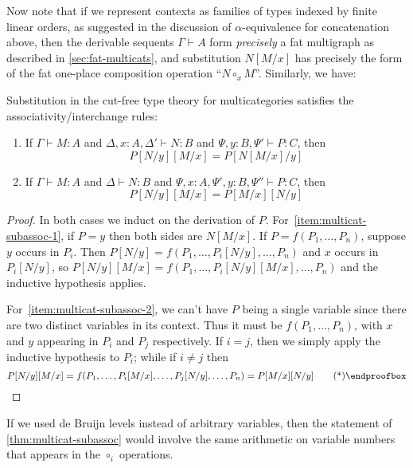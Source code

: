 \documentclass{book}
\let\types\vdash
\begin{document}
Now note that if we represent contexts as families of types indexed by finite linear orders, as suggested in the discussion of $\alpha$-equivalence for concatenation above, then the derivable sequents $\Gamma\types A$ form \emph{precisely} a fat multigraph as described in \cref{sec:fat-multicats}, and substitution $N[M/x]$ has precisely the form of the fat one-place composition operation ``$N\circ_x M$''.
Similarly, we have:

\begin{thm}\label{thm:multicat-subassoc}
  Substitution in the cut-free type theory for multicategories satisfies the associativity/interchange rules:
  \begin{enumerate}
  \item If $\Gamma\types M:A$ and $\Delta,x:A,\Delta' \types N:B$ and $\Psi,y:B,\Psi'\types P:C$, then\label{item:multicat-subassoc-1}
    \[ P[N/y][M/x] = P[N[M/x]/y] \]
  \item If $\Gamma\types M:A$ and $\Delta \types N:B$ and $\Psi,x:A,\Psi',y:B,\Psi''\types P:C$, then\label{item:multicat-subassoc-2}
    \[ P[N/y][M/x] = P[M/x][N/y] \]
  \end{enumerate}
\end{thm}
\begin{proof}
  In both cases we induct on the derivation of $P$.
  For~\ref{item:multicat-subassoc-1}, if $P=y$ then both sides are $N[M/x]$.
  If $P=f(P_1,\dots,P_n)$, suppose $y$ occurs in $P_i$.
  Then $P[N/y] = f(P_1,\dots,P_i[N/y],\dots,P_n)$ and $x$ occurs in $P_i[N/y]$, so
  $P[N/y][M/x] = f(P_1,\dots,P_i[N/y][M/x],\dots,P_n)$ and the inductive hypothesis applies.

  For~\ref{item:multicat-subassoc-2}, we can't have $P$ being a single variable since there are two distinct variables in its context.
  Thus it must be $f(P_1,\dots,P_n)$, with $x$ and $y$ appearing in $P_i$ and $P_j$ respectively.
  If $i=j$, then we simply apply the inductive hypothesis to $P_i$; while if $i\neq j$ then
  \begin{equation*}
    P[N/y][M/x] = f(P_1,\dots,P_i[M/x],\dots,P_j[N/y],\dots,P_n) = P[M/x][N/y]\qedhere
  \end{equation*}
\end{proof}

If we used de Bruijn levels instead of arbitrary variables, then the statement of \cref{thm:multicat-subassoc} would involve the same arithmetic on variable numbers that appears in the $\circ_i$ operations.
\end{document}
